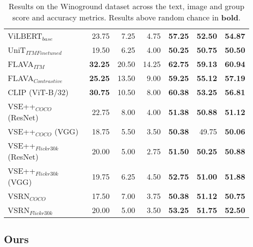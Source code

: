 \begin{table}[ht]
\begin{tabular}{l|rrr|rrr}
 ViLBERT$_{base}$             & 23.75          & 7.25           & 4.75           & \textbf{57.25} & \textbf{52.50} & \textbf{54.87} \\
 UniT$_{ITM Finetuned}$       & 19.50          & 6.25           & 4.00           & \textbf{50.25} & \textbf{50.75} & \textbf{50.50} \\
 FLAVA$_{ITM}$                & \textbf{32.25} & 20.50          & 14.25          & \textbf{62.75} & \textbf{59.13} & \textbf{60.94} \\
 FLAVA$_{Contrastive}$        & \textbf{25.25} & 13.50          & 9.00           & \textbf{59.25} & \textbf{55.12} & \textbf{57.19} \\
 CLIP (ViT-B/32)              & \textbf{30.75} & 10.50          & 8.00           & \textbf{60.38} & \textbf{53.25} & \textbf{56.81} \\
 VSE++$_{COCO}$ (ResNet)      & 22.75          & 8.00           & 4.00           & \textbf{51.38} & \textbf{50.88} & \textbf{51.12} \\
 VSE++$_{COCO}$ (VGG)         & 18.75          & 5.50           & 3.50           & \textbf{50.38} & 49.75          & \textbf{50.06} \\
 VSE++$_{Flickr30k}$ (ResNet) & 20.00          & 5.00           & 2.75           & \textbf{51.50} & \textbf{50.25} & \textbf{50.88} \\
 VSE++$_{Flickr30k}$ (VGG)    & 19.75          & 6.25           & 4.50           & \textbf{52.75} & \textbf{51.00} & \textbf{51.88} \\
 VSRN$_{COCO}$                & 17.50          & 7.00           & 3.75           & \textbf{50.38} & \textbf{51.12} & \textbf{50.75} \\
 VSRN$_{Flickr30k}$           & 20.00          & 5.00           & 3.50           & \textbf{53.25} & \textbf{51.75} & \textbf{52.50} \\
\bottomrule
\end{tabular}
\caption{Results on the Winoground dataset across the text, image and group score and accuracy metrics. Results above random chance in \textbf{bold}.}
\label{tab:results_aggr_baseline}
\end{table}

\subsection{Ours}

